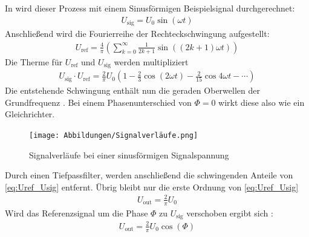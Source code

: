 In \cite[]{man:v303} wird dieser Prozess mit einem Sinusförmigen Beispielsignal durchgerechnet:
\begin{align}
    U_\text{sig} = U_{0} \sin(\omega t) 
\end{align}
Anschließend wird die Fourierreihe der Rechteckschwingung aufgestellt:
% 
\begin{align}
    U_\text{ref} = \frac{4}{\pi} \left(\sum_{k=0}^{\infty} \frac{1}{2k+1} \sin((2k+1)\omega t)\right)
\end{align}
Die Therme für $U_\text{ref}$ und $U_\text{sig}$ werden multipliziert
\begin{align}
    U_\text{sig} \cdot U_\text{ref} = 
    \frac{2}{\pi} U_0 \left(1 - \frac{2}{3} \cos(2 \omega t) - \frac{2}{15}\cos{4 \omega t} - \cdots \right) 
    \label{eq:Uref_Usig}
\end{align}
Die entstehende Schwingung enthält nun die geraden Oberwellen der Grundfrequenz \cite[vgl.][]{man:v303}.
Bei einem Phasenunterschied von $\Phi=0$ wirkt diese also wie ein Gleichrichter.
\begin{figure}
    \centering
    \texttt{[image: Abbildungen/Signalverläufe.png]}
    \caption{Signalverläufe bei einer sinusförmigen Signalspannung \cite{man:v303}}
    \label{fig:signalverlaeufe}
\end{figure}
Durch einen Tiefpassfilter, werden anschließend die schwingenden Anteile von \ref{eq:Uref_Usig} entfernt.
Übrig bleibt nur die erste Ordnung von \ref{eq:Uref_Usig}
\begin{align}
    U_\text{out} = \frac{2}{\pi} U_0
\end{align}
Wird das Referenzsignal um die Phase $\Phi$ zu $U_\text{sig}$ verschoben ergibt sich \cite[vgl.][]{man:v303}:
\begin{align}
    U_\text{out} = \frac{2}{\pi} U_0 \cos(\Phi)
    \label{eq:Uout_von_Phi}
\end{align}
